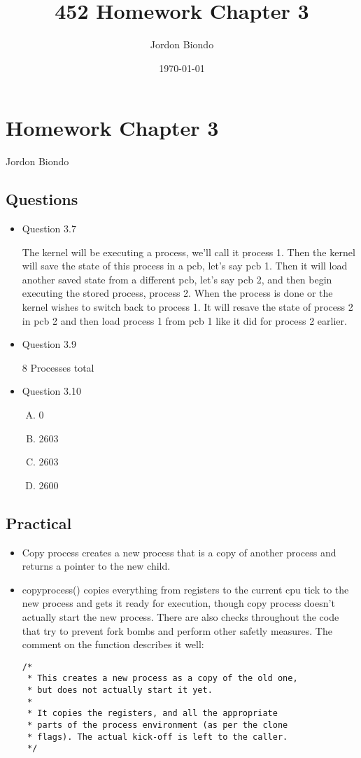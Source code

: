 \documentclass[11pt]{article}
\title{452 Homework Chapter 3}
\author{Jordon Biondo}
\date{\today}
\begin{document}
\maketitle

\setcounter{tocdepth}{3}
\tableofcontents
\section{Homework Chapter 3}
\label{sec-1}

  Jordon Biondo
\subsection{Questions}
\label{sec-1-1}

\begin{itemize}
\item Question 3.7
  
  The kernel will be executing a process, we'll call it process 1. Then the kernel will save the state of this process in a pcb, let's say pcb 1. Then it will load another saved state from a different pcb, let's say pcb 2, and then begin executing the stored process, process 2. When the process is done or the kernel wishes to switch back to process 1. It will resave the state of process 2 in pcb 2 and then load process 1 from pcb 1 like it did for process 2 earlier.
\item Question 3.9
  
     8 Processes total
\item Question 3.10
\begin{enumerate}[(A)]
\item 0
\item 2603
\item 2603
\item 2600
\end{enumerate}
\end{itemize}
\pagebreak
\subsection{Practical}
\label{sec-1-2}

\begin{itemize}
\item Copy process creates a new process that is a copy of another process and returns a pointer
     to the new child.
\item copy\textunderscore process() copies everything from registers to the current cpu tick
     to the new process and gets it ready for execution, though copy process doesn't actually
     start the new process. There are also checks throughout the code that try to prevent
     fork bombs and perform other safetly measures. The comment on the function describes it well:


\begin{verbatim}
/*
 * This creates a new process as a copy of the old one,
 * but does not actually start it yet.
 *
 * It copies the registers, and all the appropriate
 * parts of the process environment (as per the clone
 * flags). The actual kick-off is left to the caller.
 */
\end{verbatim}
\end{itemize}
     
    
\end{document}
